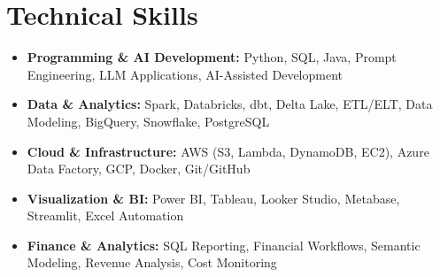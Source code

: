 \documentclass[letterpaper,11pt]{article}
\newcommand{\resumeSubHeadingListStart}{\begin{itemize}[leftmargin=0pt,label={},itemsep=-2pt]}
\newcommand{\resumeSubHeadingListEnd}{\end{itemize}}
\begin{document}
\section{Technical Skills}
 \resumeSubHeadingListStart
   \item[]{\textbf{Programming \& AI Development:} Python, SQL, Java, Prompt Engineering, LLM Applications, AI-Assisted Development}
   \item[]{\textbf{Data \& Analytics:} Spark, Databricks, dbt, Delta Lake, ETL/ELT, Data Modeling, BigQuery, Snowflake, PostgreSQL}
   \item[]{\textbf{Cloud \& Infrastructure:} AWS (S3, Lambda, DynamoDB, EC2), Azure Data Factory, GCP, Docker, Git/GitHub}
   \item[]{\textbf{Visualization \& BI:} Power BI, Tableau, Looker Studio, Metabase, Streamlit, Excel Automation}
   \item[]{\textbf{Finance \& Analytics:} SQL Reporting, Financial Workflows, Semantic Modeling, Revenue Analysis, Cost Monitoring}
 \resumeSubHeadingListEnd

\end{document}

